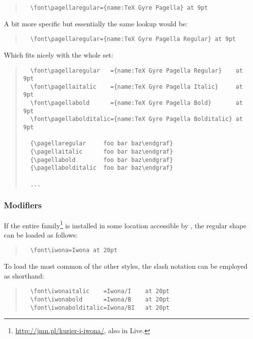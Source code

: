 \begin{quote}
  \begin{verbatim}
  \font\pagellaregular={name:TeX Gyre Pagella} at 9pt
  \end{verbatim}
\end{quote}

A bit more specific but essentially the same lookup would be:

\begin{quote}
  \begin{verbatim}
  \font\pagellaregular={name:TeX Gyre Pagella Regular} at 9pt
  \end{verbatim}
\end{quote}

\noindent
Which fits nicely with the whole set:

\begin{quote}
  \begin{verbatim}
  \font\pagellaregular   ={name:TeX Gyre Pagella Regular}    at 9pt
  \font\pagellaitalic    ={name:TeX Gyre Pagella Italic}     at 9pt
  \font\pagellabold      ={name:TeX Gyre Pagella Bold}       at 9pt
  \font\pagellabolditalic={name:TeX Gyre Pagella Bolditalic} at 9pt

  {\pagellaregular     foo bar baz\endgraf}
  {\pagellaitalic      foo bar baz\endgraf}
  {\pagellabold        foo bar baz\endgraf}
  {\pagellabolditalic  foo bar baz\endgraf}

  ...
  \end{verbatim}
\end{quote}

\subsubsection{Modifiers}

If the entire  family\footnote{%
  \url{http://jmn.pl/kurier-i-iwona/},
  also in \TEX Live.
}
is installed in some location accessible by ,
the regular shape can be loaded as follows:

\begin{quote}
  \begin{verbatim}
  \font\iwona=Iwona at 20pt
  \end{verbatim}
\end{quote}

\noindent
To load the most common of the other styles, the slash notation can
be employed as shorthand:

\begin{quote}
  \begin{verbatim}
  \font\iwonaitalic    =Iwona/I    at 20pt
  \font\iwonabold      =Iwona/B    at 20pt
  \font\iwonabolditalic=Iwona/BI   at 20pt
  \end{verbatim}
\end{quote}


